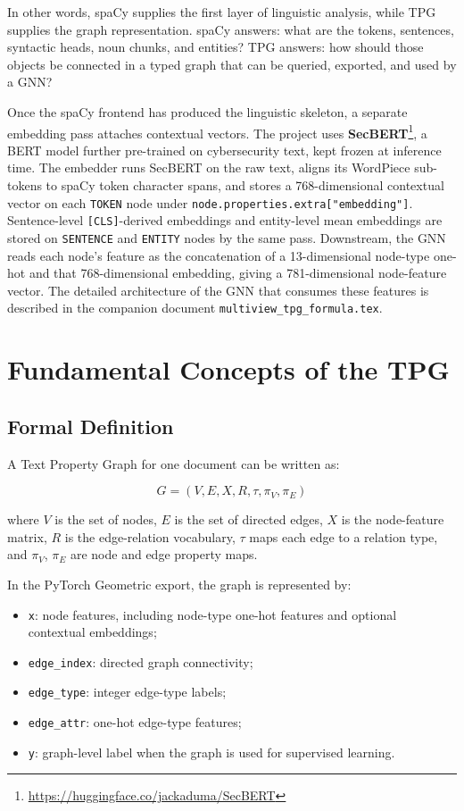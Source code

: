 \documentclass[11pt]{article}
\begin{document}
In other words, spaCy supplies the first layer of linguistic analysis, while
TPG supplies the graph representation. spaCy answers: what are the tokens,
sentences, syntactic heads, noun chunks, and entities? TPG answers: how should
those objects be connected in a typed graph that can be queried, exported, and
used by a GNN?

Once the spaCy frontend has produced the linguistic skeleton, a separate
embedding pass attaches contextual vectors. The project uses
\textbf{SecBERT}\footnote{\url{https://huggingface.co/jackaduma/SecBERT}}, a
BERT model further pre-trained on cybersecurity text, kept frozen at inference
time. The embedder runs SecBERT on the raw text, aligns its WordPiece
sub-tokens to spaCy token character spans, and stores a 768-dimensional
contextual vector on each \texttt{TOKEN} node under
\texttt{node.properties.extra["embedding"]}. Sentence-level
\texttt{[CLS]}-derived embeddings and entity-level mean embeddings are stored
on \texttt{SENTENCE} and \texttt{ENTITY} nodes by the same pass. Downstream,
the GNN reads each node's feature as the concatenation of a 13-dimensional
node-type one-hot and that 768-dimensional embedding, giving a 781-dimensional
node-feature vector. The detailed architecture of the GNN that consumes these
features is described in the companion document
\texttt{multiview\_tpg\_formula.tex}.

\section{Fundamental Concepts of the TPG}

\subsection{Formal Definition}

A Text Property Graph for one document can be written as:

\[
G = (V, E, X, R, \tau, \pi_V, \pi_E)
\]

where \(V\) is the set of nodes, \(E\) is the set of directed edges, \(X\) is
the node-feature matrix, \(R\) is the edge-relation vocabulary, \(\tau\) maps
each edge to a relation type, and \(\pi_V\), \(\pi_E\) are node and edge
property maps.

In the PyTorch Geometric export, the graph is represented by:

\begin{itemize}
    \item \texttt{x}: node features, including node-type one-hot features and
    optional contextual embeddings;
    \item \texttt{edge\_index}: directed graph connectivity;
    \item \texttt{edge\_type}: integer edge-type labels;
    \item \texttt{edge\_attr}: one-hot edge-type features;
    \item \texttt{y}: graph-level label when the graph is used for supervised
    learning.
\end{itemize}
\end{document}
